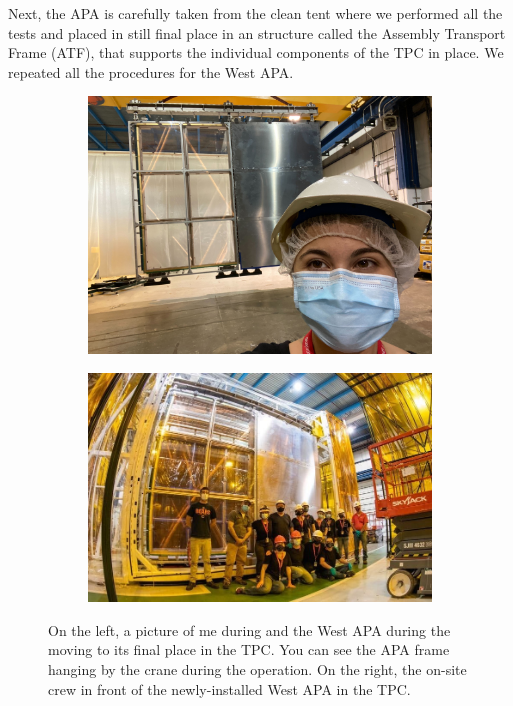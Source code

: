 Next, the APA is carefully taken from the clean tent where we performed all the tests and placed in still final place in an structure called the Assembly Transport Frame (ATF), that supports the individual components of the TPC in place. We repeated all the procedures for the West APA.
\begin{figure}[ht!]
    \centering
    \begin{subfigure}[t]{0.46\textwidth}
        \includegraphics[width=\textwidth]{Figures/west_APA_pre.jpg}
        \caption{}
    \end{subfigure}
    \hfill
    \begin{subfigure}[t]{0.49\textwidth}
        \includegraphics[width=\textwidth]{Figures/westAPA_post.jpg}
        \caption{}
    \end{subfigure}
    \caption{On the left, a picture of me during and the West APA during the moving to its final place in the TPC. You can see the APA frame hanging by the crane during the operation. On the right, the on-site crew in front of the newly-installed West APA in the TPC.}
    \label{fig:westAPA}
\end{figure}

